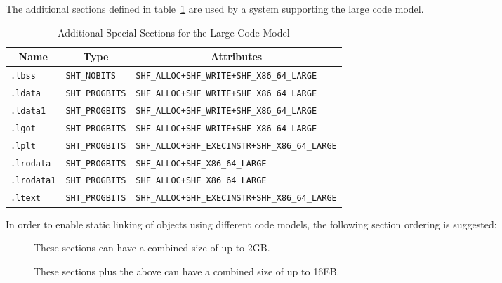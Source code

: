 The additional sections defined in table~\ref{large_sections} are used
by a system supporting the large code model.

\begin{table}[H]
\Hrule
  \caption{Additional Special Sections for the Large Code Model}
  \myfontsize
  \label{large_sections}
  \begin{center}
    \begin{tabular}[t]{l|l|l}
      \multicolumn{1}{c}{Name} & \multicolumn{1}{c}{Type}
       & \multicolumn{1}{c}{Attributes} \\
      \hline
      \texttt{.lbss} & \texttt{SHT_NOBITS} &
         \texttt{SHF_ALLOC+SHF_WRITE+SHF_X86_64_LARGE} \\
      \texttt{.ldata} & \texttt{SHT_PROGBITS} &
         \texttt{SHF_ALLOC+SHF_WRITE+SHF_X86_64_LARGE} \\
      \texttt{.ldata1} & \texttt{SHT_PROGBITS} &
         \texttt{SHF_ALLOC+SHF_WRITE+SHF_X86_64_LARGE} \\
      \texttt{.lgot} & \texttt{SHT_PROGBITS} &
         \texttt{SHF_ALLOC+SHF_WRITE+SHF_X86_64_LARGE} \\
      \texttt{.lplt} & \texttt{SHT_PROGBITS} &
         \texttt{SHF_ALLOC+SHF_EXECINSTR+SHF_X86_64_LARGE} \\
      \texttt{.lrodata} & \texttt{SHT_PROGBITS} &
         \texttt{SHF_ALLOC+SHF_X86_64_LARGE} \\
      \texttt{.lrodata1} & \texttt{SHT_PROGBITS} &
         \texttt{SHF_ALLOC+SHF_X86_64_LARGE} \\
      \texttt{.ltext} & \texttt{SHT_PROGBITS} &
         \texttt{SHF_ALLOC+SHF_EXECINSTR+SHF_X86_64_LARGE} \\
    \end{tabular}
  \end{center}
\Hrule
\end{table}

In order to enable static linking of objects using different code
models, the following section ordering is suggested:

\begin{description}
  \item[] These sections can have a combined size of up to 2GB.
  \item[] These sections plus the above can have a combined size of up
   to 16EB.
\end{description}

